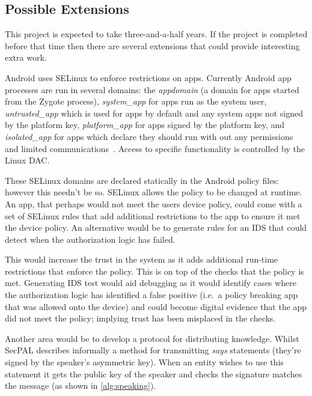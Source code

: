 \documentclass[a4paper,sfsidenotes]{%
  article%
}
\begin{document}
\subsection{Possible Extensions}

This project is expected to take three-and-a-half years. If the project is
completed before that time then there are several extensions that could provide
interesting extra work.

Android uses SELinux to enforce restrictions on apps.  Currently Android app
processes are run in several domains: the \emph{appdomain} (a domain for apps
started from the Zygote process), \emph{system\_app} for apps run as the system
user, \emph{untrusted\_app} which is used for apps by default and any system
apps not signed by the platform key, \emph{platform\_app} for apps signed by the
platform key, and \emph{isolated\_app} for apps which declare they should run
with out any permissions and limited communications~\cite{google:sepolicy}.
Access to specific functionality is controlled by the Linux \ac{DAC}.

These SELinux domains are declared statically in the Android policy files:
however this needn't be so.  SELinux allows the policy to be changed at runtime.
An app, that perhaps would not meet the users device policy, could come with a
set of SELinux rules that add additional restrictions to the app to ensure it
met the device policy.  An alternative would be to generate rules for an
\ac{IDS} that could detect when the authorization logic has failed.

This would increase the trust in the system as it adds additional run-time
restrictions that enforce the policy.  This is on top of the checks that the policy is
met.  Generating \ac{IDS} test would aid debugging as it would identify cases
where the authorization logic has identified a false positive (i.e.~a policy
breaking app that was allowed onto the device) and could become digital evidence
that the app did not meet the policy; implying trust has been misplaced in the
checks.

Another area would be to develop a protocol for distributing knowledge.  
Whilst SecPAL describes informally a method for transmitting \emph{says}
statements (they're signed by the speaker's asymmetric key).  When an entity
wishes to use this statement it gets the public key of the speaker and checks
the signature matches the message (as shown in \autoref{alg:speaking}).  
\end{document}

